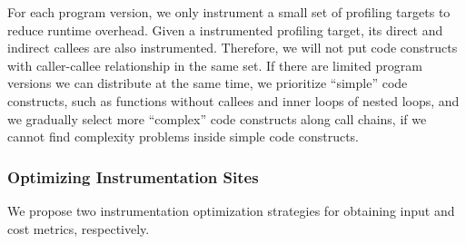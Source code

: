 For each program version, we only instrument a small set of profiling targets
to reduce runtime overhead.
Given a instrumented profiling target,
its direct and indirect callees are also instrumented. 
Therefore, we will not put code constructs with caller-callee 
relationship in the same set. 
If there are limited program versions we can distribute at the same time,
we prioritize ``simple'' code constructs, such as 
functions without callees and inner loops of nested loops,
and we gradually select more ``complex'' code constructs along call chains, 
if we cannot find complexity problems inside simple code constructs.




\subsubsection{Optimizing Instrumentation Sites}
\label{sec:site_opt}


We propose two instrumentation optimization strategies for obtaining
input and cost metrics, respectively. 


